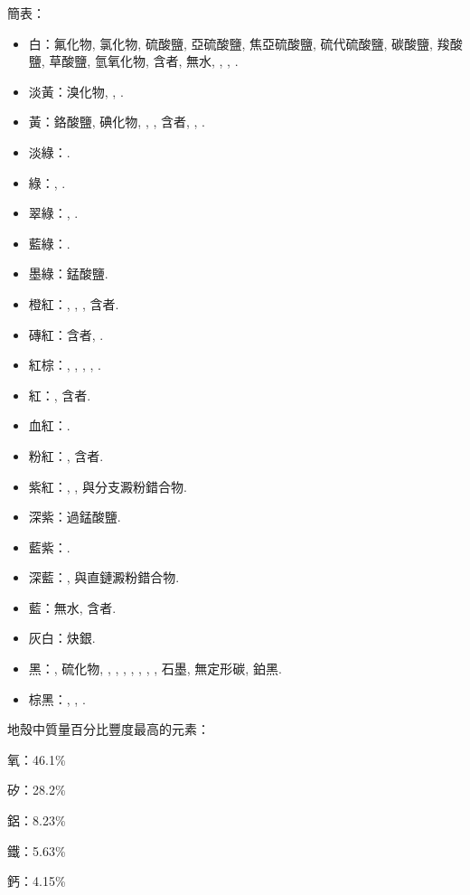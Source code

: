 \documentclass[a4paper,12pt]{report}
\begin{document}
簡表：
\begin{itemize}
\item 白：氟化物, 氯化物, 硫酸鹽, 亞硫酸鹽, 焦亞硫酸鹽, 硫代硫酸鹽, 碳酸鹽, 羧酸鹽, 草酸鹽, 氫氧化物, 含者, 無水, , , .
\item 淡黃：溴化物, , .
\item 黃：鉻酸鹽, 碘化物, , , 含者, , .
\item 淡綠：\ce{[Fe(H2O)4(OH)2]}.
\item 綠：, .
\item 翠綠：, .
\item 藍綠：.
\item 墨綠：錳酸鹽.
\item 橙紅：, , , 含者.
\item 磚紅：含者, .
\item 紅棕：, , , , .
\item 紅：, 含者.
\item 血紅：.
\item 粉紅：, 含者.
\item 紫紅：, \ce{[Co(H2O)2Cl2]}, 與分支澱粉錯合物.
\item 深紫：過錳酸鹽.
\item 藍紫：.
\item 深藍：, 與直鏈澱粉錯合物.
\item 藍：無水, 含者.
\item 灰白：炔銀.
\item 黑：, 硫化物, , , , , , , , 石墨, 無定形碳, 鉑黑.
\item 棕黑：, , .
\end{itemize}
地殼中質量百分比豐度最高的元素： 
\ben
\item 氧：46.1\%
\item 矽：28.2\%
\item 鋁：8.23\%
\item 鐵：5.63\%
\item 鈣：4.15\%
\end{document}
